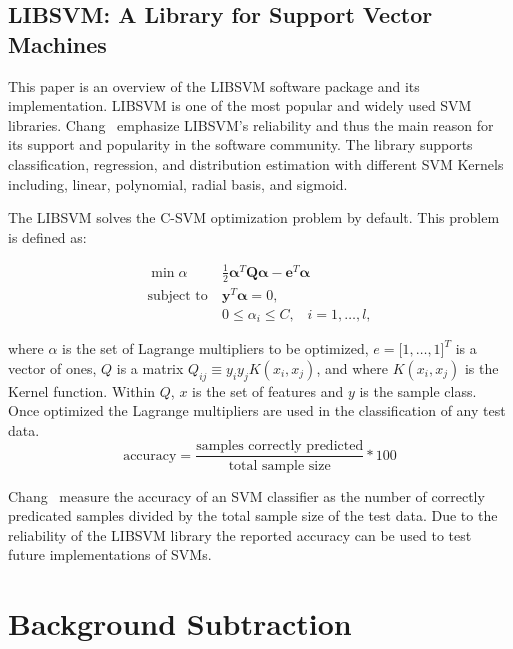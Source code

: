 \subsection{LIBSVM\@: A Library for Support Vector Machines}
\label{sec:svm_libsvm}

This paper is an overview of the LIBSVM software package and its implementation. LIBSVM is one of the most popular and widely used SVM libraries\cite{chang_2011_libsvm}. Chang~\etal{}\cite{chang_2011_libsvm} emphasize LIBSVM's reliability and thus the main reason for its support and popularity in the software community. The library supports classification, regression, and distribution estimation with different SVM Kernels including, linear, polynomial, radial basis, and sigmoid.

The LIBSVM solves the C-SVM optimization problem by default. This problem is defined as:

\begin{align}
\min{\alpha} \;\;\; & \frac{1}{2} \bm{\alpha} ^T \bm{Q} \bm{\alpha} - \bm{e}^T \bm{\alpha} \nonumber \\
\text{subject to} \: &\bm{y}^T \bm{\alpha}=0,\\
&0 \le \alpha_i \le C, \;\;\; i=1,\ldots,l, \nonumber
\label{eq:opt_svm}
\end{align}

\noindent where $\alpha$ is the set of Lagrange multipliers to be optimized, $e=\lbrack1,\ldots,1\rbrack^T$ is a vector of ones, $Q$ is a matrix $Q_{ij} \equiv y_i y_j K(x_i,x_j)$, and where $K(x_i,x_j)$ is the Kernel function. Within $Q$, $x$ is the set of features and $y$ is the sample class. Once optimized the Lagrange multipliers are used in the classification of any test data.
\begin{equation} \text{accuracy}= \frac{\text{samples correctly predicted}}{\text{total sample size}} * 100 \label{eq:svm_accuracy}
\end{equation}

Chang~\etal{}\cite{chang_2011_libsvm} measure the accuracy of an SVM classifier as the number of correctly predicated samples divided by the total sample size of the test data. Due to the reliability of the LIBSVM library the reported accuracy can be used to test future implementations of SVMs.


\section{Background Subtraction}
\label{sec:work_background_subtraction}

